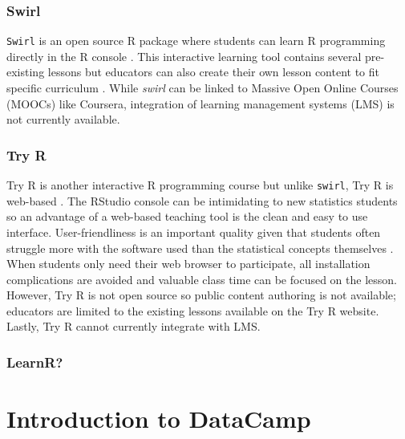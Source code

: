 \documentclass{tise_style_doi}
\begin{document}
\subsubsection{Swirl}

\texttt{Swirl} is an open source R package where students can learn R programming
directly in the R console \citep{Kross}. This interactive learning tool contains several
pre-existing lessons but educators can also create their own lesson content to fit
specific curriculum \citep{Carchedi2014}.  While \textit{swirl} can be linked to Massive
Open Online Courses (MOOCs) like Coursera, integration of learning management systems (LMS)
is not currently available.

\subsubsection{Try R}

Try R is another interactive R programming course but unlike \texttt{swirl}, Try R
is web-based \citep{TryR}. The RStudio console can be intimidating to new statistics students
so an  advantage of a web-based teaching tool is the clean and easy to use interface.
User-friendliness is an important quality given that students often struggle more
with the software used than the statistical concepts themselves \citep{Hare2017}.
When students only need their web browser to participate, all installation
complications are avoided and valuable class time can be focused on the lesson.
However, Try R is not open source so public content authoring is not available;
educators are limited to the existing lessons available on the Try R website.
Lastly, Try R cannot currently integrate with LMS.

\subsubsection{LearnR?}



\section{Introduction to DataCamp}
\end{document}
